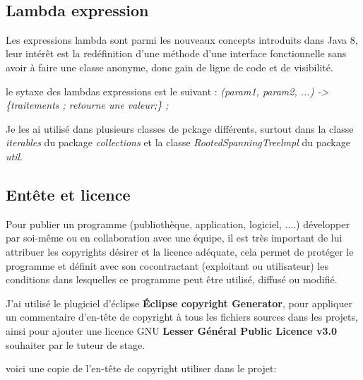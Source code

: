 \documentclass[12pt]{report}
\begin{document}
\newpage
~\\
\subsection{Lambda expression}

Les expressions lambda sont parmi les nouveaux concepts introduits dans Java 8, leur intérêt est la redéfinition d'une méthode d'une interface fonctionnelle sans avoir à faire une classe anonyme, donc gain de ligne de code et de visibilité.\newline

le sytaxe des lambdas expressions est le suivant :\newline
\textit{(param1, param2, ...) -> \{traitements ; retourne une valeur;\} ;} \newline

Je les ai utilisé dans plusieurs classes de pckage différents, surtout dans la classe \textit{iterables} du package \textit{collections} et la classe \textit{RootedSpanningTreelmpl} du package \textit{util}.\newline

\subsection{Entête et licence}

Pour publier un programme (publiothèque, application, logiciel, ....) développer par soi-même ou en collaboration avec une équipe, il est très important de lui attribuer les copyrights désirer et la licence adéquate, cela permet de protéger le programme et définit avec son cocontractant (exploitant ou utilisateur) les conditions dans lesquelles ce programme peut être utilisé, diffusé ou modifié.\newline

J'ai utilisé le plugiciel d'éclipse \textbf{Éclipse copyright Generator}, pour appliquer un commentaire d'en-tête de copyright à tous les fichiers sources dans les projets, ainsi pour ajouter une licence GNU \textbf{Lesser Général Public Licence v3.0} souhaiter par le tuteur de stage.\newline 

voici une copie de l'en-tête de copyright utiliser dans le projet:\newline
\end{document}
